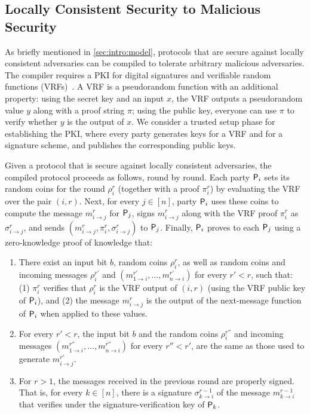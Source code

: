 \subsection{Locally Consistent Security to Malicious Security}\label{sec:intro:LocalToFull}

As briefly mentioned in \cref{sec:intro:model}, protocols that are secure against locally consistent adversaries can be compiled to tolerate arbitrary malicious adversaries.
The compiler requires a PKI for digital signatures and verifiable random functions (VRFs)~\cite{MRV99}. A VRF is a pseudorandom function with an additional property: using the secret key and an input $x$, the VRF outputs a pseudorandom value $y$ along with a proof string $\pi$; using the public key, everyone can use $\pi$ to verify whether $y$ is the output of $x$. We consider a trusted setup phase for establishing the PKI, where every party generates keys for a VRF and for a signature scheme, and publishes the corresponding public keys.

Given a protocol that is secure against locally consistent adversaries, the compiled protocol proceeds as follows, round by round.
Each party $\mathsf{P}_i$ sets its random coins for the \rth round $\rho_i^r$ (together with a proof $\pi_i^r$) by evaluating the VRF over the pair $(i,r)$.
Next, for every $j\in[n]$, party $\mathsf{P}_i$ uses these coins to compute the message $m^r_{i\to j}$ for $\mathsf{P}_j$, signs $m^r_{i\to j}$ along with the VRF proof $\pi^r_i$ as $\sigma^r_{i\to j}$, and sends $(m^r_{i\to j},\pi_i^r,\sigma^r_{i\to j})$ to $\mathsf{P}_j$.
Finally, $\mathsf{P}_i$ proves to each $\mathsf{P}_j$ using a zero-knowledge proof of knowledge that:
\begin{enumerate}
    \item
    There exist an input bit $b$, random coins $\rho_i^r$, as well as random coins and incoming messages $\rho^{r'}_i$ and $(m^{r'}_{1\to i},\ldots,m^{r'}_{n\to i})$ for every $r'<r$, such that: (1) $\pi_i^r$ verifies that $\rho_i^r$ is the VRF output of $(i,r)$ (using the VRF public key of $\mathsf{P}_i$), and (2) the message $m^r_{i\to j}$ is the output of the next-message function of $\mathsf{P}_i$ when applied to these values.
    \item
    For every $r'<r$, the input bit $b$ and the random coins $\rho^{r''}_i$ and incoming messages $(m^{r''}_{1\to i},\ldots,m^{r''}_{n\to i})$ for every $r''<r'$, are the same as those used to generate $m^{r'}_{i\to j}$.
    \item
    For $r>1$, the messages received in the previous round are properly signed. That is, for every $k\in[n]$, there is a signature $\sigma^{r-1}_{k\to i}$ of the message $m^{r-1}_{k\to i}$ that verifies under the signature-verification key of $\mathsf{P}_k$.
\end{enumerate}

